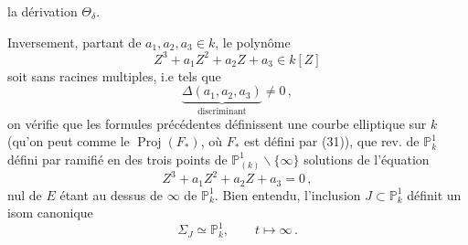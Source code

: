 la dérivation $\Theta_\delta$.

Inversement, partant de $a_1,a_2,a_3\in k$,   le polynôme
\[
 Z^3+a_1Z^2+a_2Z+a_3\in k[Z]
\]
soit sans racines multiples, i.e tels que
\[
 \underbrace{\Delta(a_1,a_2,a_3)}_{\text{discriminant}}\ne0\,, \tag*{(34)}
\]
on vérifie que les formules précédentes définissent une courbe elliptique sur $k$ (qu'on peut   comme le $\operatorname{Proj}(F_*)$, où $F_*$ est défini par (31)),   que rev.   de $\mathbb P^1_k$ défini par
ramifié en  des trois points  de $\mathbb P^1_{(k)}\smallsetminus\{\infty\}$  solutions de l'équation
\[
 Z^3+a_1Z^2+a_2Z+a_3=0\,, \tag*{(36)}
\]
  nul de $E$ étant au dessus de   $\infty$ de $\mathbb P^1_k$.  Bien  entendu, l'inclusion $J\subset\mathbb P^1_k$ définit un isom canonique
\[
 \Sigma_J\simeq\mathbb P^1_k,\qquad t\mapsto\infty\,. \tag*{(37}
\]
